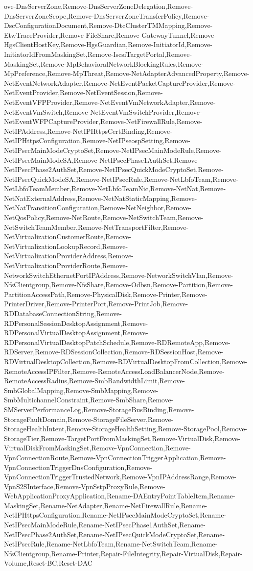{{ove-DnsServerZone,Remove-DnsServerZoneDelegation,Remove-DnsServerZoneScope,Remove-DnsServerZoneTransferPolicy,Remove-DscConfigurationDocument,Remove-DtcClusterTMMapping,Remove-EtwTraceProvider,Remove-FileShare,Remove-GatewayTunnel,Remove-HgsClientHostKey,Remove-HgsGuardian,Remove-InitiatorId,Remove-InitiatorIdFromMaskingSet,Remove-IscsiTargetPortal,Remove-MaskingSet,Remove-MpBehavioralNetworkBlockingRules,Remove-MpPreference,Remove-MpThreat,Remove-NetAdapterAdvancedProperty,Remove-NetEventNetworkAdapter,Remove-NetEventPacketCaptureProvider,Remove-NetEventProvider,Remove-NetEventSession,Remove-NetEventVFPProvider,Remove-NetEventVmNetworkAdapter,Remove-NetEventVmSwitch,Remove-NetEventVmSwitchProvider,Remove-NetEventWFPCaptureProvider,Remove-NetFirewallRule,Remove-NetIPAddress,Remove-NetIPHttpsCertBinding,Remove-NetIPHttpsConfiguration,Remove-NetIPseospSetting,Remove-NetIPsecMainModeCryptoSet,Remove-NetIPsecMainModeRule,Remove-NetIPsecMainModeSA,Remove-NetIPsecPhase1AuthSet,Remove-NetIPsecPhase2AuthSet,Remove-NetIPsecQuickModeCryptoSet,Remove-NetIPsecQuickModeSA,Remove-NetIPsecRule,Remove-NetLbfoTeam,Remove-NetLbfoTeamMember,Remove-NetLbfoTeamNic,Remove-NetNat,Remove-NetNatExternalAddress,Remove-NetNatStaticMapping,Remove-NetNatTransitionConfiguration,Remove-NetNeighbor,Remove-NetQosPolicy,Remove-NetRoute,Remove-NetSwitchTeam,Remove-NetSwitchTeamMember,Remove-NetTransportFilter,Remove-NetVirtualizationCustomerRoute,Remove-NetVirtualizationLookupRecord,Remove-NetVirtualizationProviderAddress,Remove-NetVirtualizationProviderRoute,Remove-NetworkSwitchEthernetPortIPAddress,Remove-NetworkSwitchVlan,Remove-NfsClientgroup,Remove-NfsShare,Remove-Odbsn,Remove-Partition,Remove-PartitionAccessPath,Remove-PhysicalDisk,Remove-Printer,Remove-PrinterDriver,Remove-PrinterPort,Remove-PrintJob,Remove-RDDatabaseConnectionString,Remove-RDPersonalSessionDesktopAssignment,Remove-RDPersonalVirtualDesktopAssignment,Remove-RDPersonalVirtualDesktopPatchSchedule,Remove-RDRemoteApp,Remove-RDServer,Remove-RDSessionCollection,Remove-RDSessionHost,Remove-RDVirtualDesktopCollection,Remove-RDVirtualDesktopFromCollection,Remove-RemoteAccessIPFilter,Remove-RemoteAccessLoadBalancerNode,Remove-RemoteAccessRadius,Remove-SmbBandwidthLimit,Remove-SmbGlobalMapping,Remove-SmbMapping,Remove-SmbMultichannelConstraint,Remove-SmbShare,Remove-SMServerPerformanceLog,Remove-StorageBusBinding,Remove-StorageFaultDomain,Remove-StorageFileServer,Remove-StorageHealthIntent,Remove-StorageHealthSetting,Remove-StoragePool,Remove-StorageTier,Remove-TargetPortFromMaskingSet,Remove-VirtualDisk,Remove-VirtualDiskFromMaskingSet,Remove-VpnConnection,Remove-VpnConnectionRoute,Remove-VpnConnectionTriggerApplication,Remove-VpnConnectionTriggerDnsConfiguration,Remove-VpnConnectionTriggerTrustedNetwork,Remove-VpnIPAddressRange,Remove-VpnS2SInterface,Remove-VpnSstpProxyRule,Remove-WebApplicationProxyApplication,Rename-DAEntryPointTableItem,Rename-MaskingSet,Rename-NetAdapter,Rename-NetFirewallRule,Rename-NetIPHttpsConfiguration,Rename-NetIPsecMainModeCryptoSet,Rename-NetIPsecMainModeRule,Rename-NetIPsecPhase1AuthSet,Rename-NetIPsecPhase2AuthSet,Rename-NetIPsecQuickModeCryptoSet,Rename-NetIPsecRule,Rename-NetLbfoTeam,Rename-NetSwitchTeam,Rename-NfsClientgroup,Rename-Printer,Repair-FileIntegrity,Repair-VirtualDisk,Repair-Volume,Reset-BC,Reset-DAC}}
